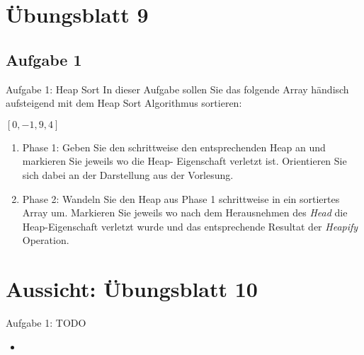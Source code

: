 \section{Übungsblatt 9}
\subsection{Aufgabe 1}
{\taskenum
\begin{frame}{Aufgabe 1: Heap Sort}
    In dieser Aufgabe sollen Sie das folgende Array händisch aufsteigend mit dem Heap Sort Algorithmus sortieren: \begin{center}
    \([0, -1, 9, 4]\)
\end{center}
\begin{enumerate}
    \item Phase 1: Geben Sie den schrittweise den entsprechenden Heap an und markieren Sie jeweils wo die Heap-
    Eigenschaft verletzt ist. Orientieren Sie sich dabei an der Darstellung aus der Vorlesung.
    \item Phase 2: Wandeln Sie den Heap aus Phase 1 schrittweise in ein sortiertes Array um. Markieren Sie jeweils wo nach dem Herausnehmen des \textit{Head} die Heap-Eigenschaft verletzt wurde und das entsprechende Resultat der \textit{Heapify} Operation.
\end{enumerate}
\endtaskblock
\end{frame}
}

\iffull
{}
\section{Aussicht: Übungsblatt 10}

\begin{frame}{Aufgabe 1: TODO}
\begin{itemize}[<+(1)->]
    \item
\end{itemize}
\end{frame}


\iffull\fi

